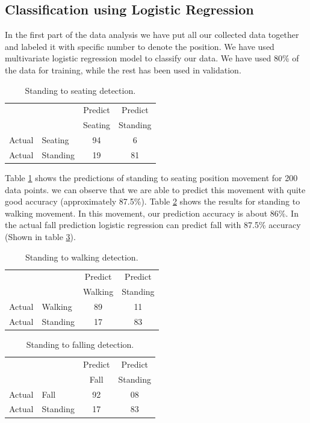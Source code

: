 \documentclass{llncs}
\begin{document}
\begin{sloppy}
\subsection*{Classification using Logistic Regression}

In the first part of the data analysis we have put all our collected data together and labeled it
with specific number to denote the position. We have used multivariate logistic regression model to
classify our data. We have used 80\% of the data for training, while the rest has been used
in validation.

\begin{table}[!h]
	\caption{Standing to seating detection.}	
	\label{tab:StandingToSeatingDetection}
	\centering
		\begin{tabular} {l l |c |c}
			& & Predict& Predict \\ 
			& & Seating & Standing \\ \hline
			Actual& Seating & 94 & 6\\ \hline
			Actual& Standing & 19& 81\\ \hline
		\end{tabular}
\end{table}

Table \ref{tab:StandingToSeatingDetection} shows the predictions of standing to seating position
movement for 200 data points. we can observe that we are able
to predict this movement with quite good accuracy (approximately 87.5\%). Table
 \ref{tab:StandingToWalkingDetection} shows the results for  standing to walking movement. In this
movement, our prediction accuracy is about 86\%. In the actual fall prediction logistic
regression can predict fall with 87.5\% accuracy (Shown in table
 \ref{tab:StandingToFallingDetection}).
\vspace{-5mm}
\begin{table}
\caption{Standing to walking detection.}
	\label{tab:StandingToWalkingDetection}
\centering
		\begin{tabular} {l l |c |c}
			& & Predict& Predict \\ 
			& & Walking & Standing \\ \hline
			Actual& Walking & 89 & 11\\ \hline
			Actual& Standing & 17& 83\\ \hline
		\end{tabular}
\end{table}
\vspace{-10mm}
\begin{table}[!h]
\caption{Standing to falling detection.}
\label{tab:StandingToFallingDetection}
\centering
		\begin{tabular} {l l |c |c}
			& & Predict& Predict \\ 
			& & Fall & Standing \\ \hline
			Actual& Fall & 92 & 08\\ \hline
			Actual& Standing & 17& 83\\ \hline
		\end{tabular}
\end{table}
\vspace{-5mm}

\end{sloppy}
\end{document}
